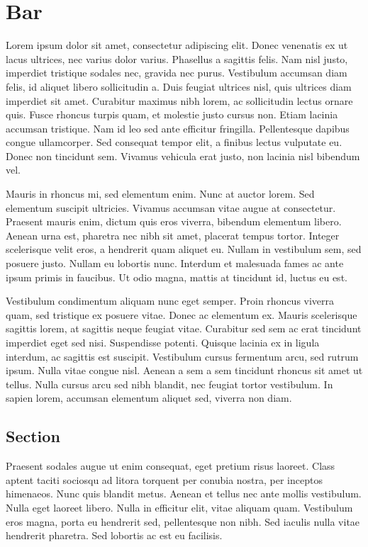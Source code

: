 \chapter{Bar}

Lorem ipsum dolor sit amet, consectetur adipiscing elit. Donec venenatis ex ut lacus ultrices, nec varius dolor varius. Phasellus a sagittis felis. Nam nisl justo, imperdiet tristique sodales nec, gravida nec purus. Vestibulum accumsan diam felis, id aliquet libero sollicitudin a. Duis feugiat ultrices nisl, quis ultrices diam imperdiet sit amet. Curabitur maximus nibh lorem, ac sollicitudin lectus ornare quis. Fusce rhoncus turpis quam, et molestie justo cursus non. Etiam lacinia accumsan tristique. Nam id leo sed ante efficitur fringilla. Pellentesque dapibus congue ullamcorper. Sed consequat tempor elit, a finibus lectus vulputate eu. Donec non tincidunt sem. Vivamus vehicula erat justo, non lacinia nisl bibendum vel.

Mauris in rhoncus mi, sed elementum enim. Nunc at auctor lorem. Sed elementum suscipit ultricies. Vivamus accumsan vitae augue at consectetur. Praesent mauris enim, dictum quis eros viverra, bibendum elementum libero. Aenean urna est, pharetra nec nibh sit amet, placerat tempus tortor. Integer scelerisque velit eros, a hendrerit quam aliquet eu. Nullam in vestibulum sem, sed posuere justo. Nullam eu lobortis nunc. Interdum et malesuada fames ac ante ipsum primis in faucibus. Ut odio magna, mattis at tincidunt id, luctus eu est.

Vestibulum condimentum aliquam nunc eget semper. Proin rhoncus viverra quam, sed tristique ex posuere vitae. Donec ac elementum ex. Mauris scelerisque sagittis lorem, at sagittis neque feugiat vitae. Curabitur sed sem ac erat tincidunt imperdiet eget sed nisi. Suspendisse potenti. Quisque lacinia ex in ligula interdum, ac sagittis est suscipit. Vestibulum cursus fermentum arcu, sed rutrum ipsum. Nulla vitae congue nisl. Aenean a sem a sem tincidunt rhoncus sit amet ut tellus. Nulla cursus arcu sed nibh blandit, nec feugiat tortor vestibulum. In sapien lorem, accumsan elementum aliquet sed, viverra non diam.

\section{Section}

Praesent sodales augue ut enim consequat, eget pretium risus laoreet. Class aptent taciti sociosqu ad litora torquent per conubia nostra, per inceptos himenaeos. Nunc quis blandit metus. Aenean et tellus nec ante mollis vestibulum. Nulla eget laoreet libero. Nulla in efficitur elit, vitae aliquam quam. Vestibulum eros magna, porta eu hendrerit sed, pellentesque non nibh. Sed iaculis nulla vitae hendrerit pharetra. Sed lobortis ac est eu facilisis.

